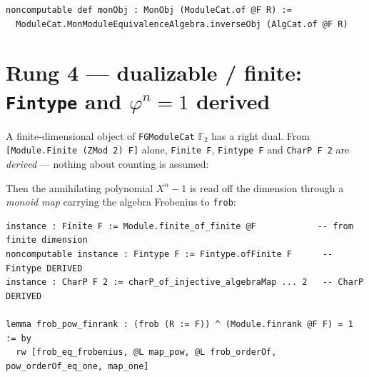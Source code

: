 \documentclass[11pt]{article}
\newcommand{\lc}[1]{\texttt{\small #1}}
\newcommand{\Ff}{\mathbb{F}_2}
\newcommand{\End}{\operatorname{End}}
\newcommand{\Module}{\operatorname{Module}}
\begin{document}
\begin{lstlisting}
noncomputable def monObj : MonObj (ModuleCat.of @F R) :=
  ModuleCat.MonModuleEquivalenceAlgebra.inverseObj (AlgCat.of @F R)
\end{lstlisting}

\section{Rung 4 --- dualizable / finite: \lc{Fintype} and $\varphi^{n}=1$ derived}

A finite-dimensional object of \lc{FGModuleCat} $\Ff$ has a right dual. From
\lc{[Module.Finite (ZMod 2) F]} alone, \lc{Finite F}, \lc{Fintype F} and
\lc{CharP F 2} are \emph{derived} --- nothing about counting is assumed:

\begin{center}
\end{center}

Then the annihilating polynomial $X^{n}-1$ is read off the dimension through a
\emph{monoid map} carrying the algebra Frobenius to \lc{frob}:

\begin{center}
\end{center}

\begin{lstlisting}
instance : Finite F := Module.finite_of_finite @F            -- from finite dimension
noncomputable instance : Fintype F := Fintype.ofFinite F      -- Fintype DERIVED
instance : CharP F 2 := charP_of_injective_algebraMap ... 2   -- CharP DERIVED

lemma frob_pow_finrank : (frob (R := F)) ^ (Module.finrank @F F) = 1 := by
  rw [frob_eq_frobenius, @L map_pow, @L frob_orderOf, pow_orderOf_eq_one, map_one]
\end{lstlisting}
\end{document}
